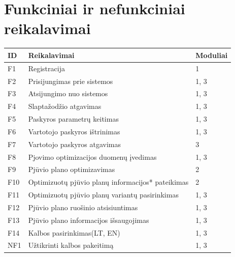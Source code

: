 \documentclass[a4paper,12pt]{article}
\begin{document}
\section{Funkciniai ir nefunkciniai reikalavimai}
\begin{frame}
\centering

\label{my-label}
\begin{tabular}{|l|l|l|}
\hline
\textbf{ID}	& \textbf{Reikalavimai}						& \textbf{Moduliai}  \\ \hline

F1	& Registracija										& 1	     		\\ \hline

F2	& Prisijungimas prie sistemos						& 1, 3			\\ \hline

F3	& Atsijungimo nuo sistemos							& 1, 3			\\ \hline

F4	& Slaptažodžio atgavimas								& 1, 3			\\ \hline

F5	& Paskyros parametrų keitimas 	  					& 1, 3			\\ \hline 

F6	& Vartotojo paskyros ištrinimas						& 1, 3			\\ \hline

F7	& Vartotojo paskyros atgavimas						& 3				\\ \hline

F8	& Pjovimo optimizacijos duomenų įvedimas				& 1, 3			\\ \hline

F9	& Pjūvio plano optimizavimas           	   			& 2				\\ \hline

F10	& Optimizuotų pjūvio planų informacijos* pateikimas	& 2     			\\ \hline

F11	& Optimizuotų pjūvio planų variantų pasirinkimas		& 1, 3			\\ \hline

F12 & Pjūvio plano ruošinio atsisiuntimas				& 1, 3			\\ \hline

F13 	& Pjūvio plano informacijos išsaugojimas				& 1, 3			\\ \hline

F14	& Kalbos pasirinkimas(LT, EN)						& 1, 3			\\ \hline

NF1 & Užtikrinti kalbos pakeitimą						& 1, 3			\\ \hline


\end{tabular}
\end{frame}
\end{document}
